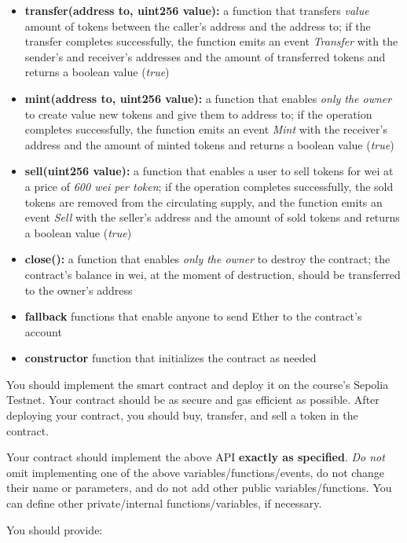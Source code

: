 \documentclass[12pt,addpoints,answers]{exam}
\begin{document}
\begin{questions}
\begin{itemize}
\item \textbf{transfer(address to, uint256 value):} a function that transfers \emph{value} amount of tokens
between the caller’s address and the address to; if the transfer completes successfully, the
function emits an event \emph{Transfer} with the sender’s and receiver’s addresses and the amount
of transferred tokens and returns a boolean value (\emph{true})
\item \textbf{mint(address to, uint256 value):} a function that enables \emph{only the owner} to create value new tokens and give them to address to; if the operation completes successfully, the
function emits an event \emph{Mint} with the receiver’s address and the amount of minted tokens
and returns a boolean value (\emph{true})
\item \textbf{sell(uint256 value):} a function that enables a user to sell tokens for wei at a price of \emph{600 wei per token}; if the operation completes successfully, the sold tokens are removed from
the circulating supply, and the function emits an event \emph{Sell} with the seller’s address and the
amount of sold tokens and returns a boolean value (\emph{true})
\item \textbf{close():} a function that enables \emph{only the owner} to destroy the contract; the contract’s
balance in wei, at the moment of destruction, should be transferred to the owner's address
\item \textbf{fallback} functions that enable anyone to send Ether to the contract’s account
\item \textbf{constructor} function that initializes the contract as needed

\end{itemize}
      
You should implement the smart contract and deploy it on the course's Sepolia Testnet. Your contract should be as secure and gas efficient as possible. After deploying your contract, you should buy, transfer, and sell a token in the contract. 

Your contract should implement the above API \textbf{exactly as specified}. \emph{Do not} omit implementing one of the above variables/functions/events, do not change their name or parameters, and do not add other public variables/functions. You can define other private/internal functions/variables, if necessary.

You should provide:

\begin{parts}


\end{parts}
\end{questions}
\end{document}
